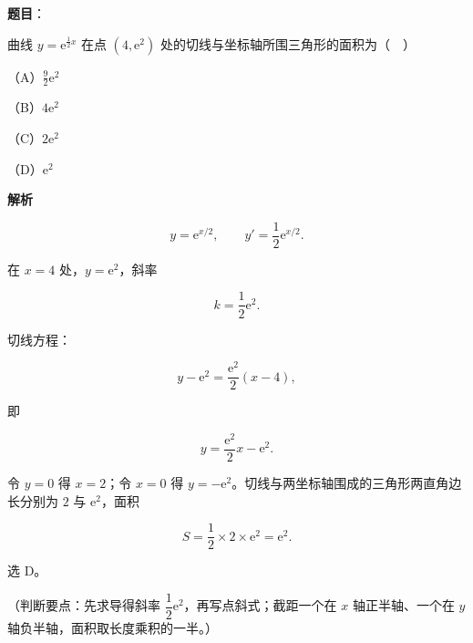 \begin{answer}

\textbf{题目}：

曲线 $y=\mathrm e^{\frac12x}$ 在点 $(4,\mathrm e^2)$ 处的切线与坐标轴所围三角形的面积为（　）

（A）$\frac92\mathrm e^2$

（B）$4\mathrm e^2$

（C）$2\mathrm e^2$

（D）$\mathrm e^2$

\textbf{解析}

\nopagebreak[4]
\[y=\mathrm e^{x/2},\qquad y'=\frac12\mathrm e^{x/2}.\]

在 $x=4$ 处，$y=\mathrm e^2$，斜率

\nopagebreak[4]
\[k=\frac12\mathrm e^2.\]

切线方程：

\nopagebreak[4]
\[y-\mathrm e^2=\frac{\mathrm e^2}{2}(x-4),\]

即

\nopagebreak[4]
\[y=\frac{\mathrm e^2}{2}x-\mathrm e^2.\]

令 $y=0$ 得 $x=2$；令 $x=0$ 得 $y=-\mathrm e^2$。切线与两坐标轴围成的三角形两直角边长分别为 $2$ 与 $\mathrm e^2$，面积

\nopagebreak[4]
\[S=\frac12\times2\times\mathrm e^2=\mathrm e^2.\]

选 D。

（判断要点：先求导得斜率 $\dfrac12\mathrm e^2$，再写点斜式；截距一个在 $x$ 轴正半轴、一个在 $y$ 轴负半轴，面积取长度乘积的一半。）


\end{answer}
